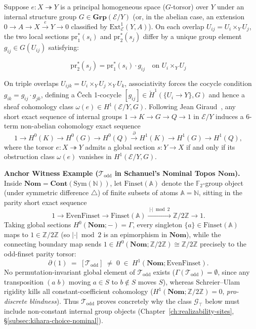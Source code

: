 \documentclass[10pt,twoside,openright]{book}
\theoremstyle{crmplain}
\theoremstyle{crmdef}
\theoremstyle{crmremark}
\begin{document}
Suppose $e: X \twoheadrightarrow Y$ is a principal homogeneous space ($G$-torsor) over $Y$ under an internal structure group $G \in \mathbf{Grp}(\mathcal{E}/Y)$ (or, in the abelian case, an extension $0 \to A \to X \xrightarrow{e} Y \to 0$ classified by $\mathrm{Ext}^1_{\mathcal{E}}(Y, A)$). On each overlap $U_{ij} = U_i \times_Y U_j$, the two local sections $\mathrm{pr}_1^*(s_i)$ and $\mathrm{pr}_2^*(s_j)$ differ by a unique group element $g_{ij} \in G(U_{ij})$ satisfying:

\[
  \mathrm{pr}_2^*(s_j) = \mathrm{pr}_1^*(s_i) \cdot g_{ij} \quad \text{on } U_i \times_Y U_j
\]

On triple overlaps $U_{ijk} = U_i \times_Y U_j \times_Y U_k$, associativity forces the cocycle condition $g_{ik} = g_{ij} \cdot g_{jk}$, defining a \v{C}ech 1-cocycle $[g_{ij}] \in \check{H}^1(\{U_i \to Y\}, G)$ and hence a sheaf cohomology class $\omega(e) \in H^1(\mathcal{E}/Y, G)$. Following Jean Giraud~\cite[Chs.~III--IV]{Giraud71}, any short exact sequence of internal groups $1 \to K \to G \to Q \to 1$ in $\mathcal{E}/Y$ induces a $6$-term non-abelian cohomology exact sequence
\[
  1 \longrightarrow H^0(K) \longrightarrow H^0(G) \longrightarrow H^0(Q) \xrightarrow{\;\partial\;} H^1(K) \longrightarrow H^1(G) \longrightarrow H^1(Q),
\]
where the torsor $e: X \twoheadrightarrow Y$ admits a global section $s: Y \to X$ if and only if its obstruction class $\omega(e)$ vanishes in $H^1(\mathcal{E}/Y, G)$.

\medskip
\noindent\textbf{Anchor Witness Example ($\mathcal{T}_{\mathrm{odd}}$ in Schanuel's Nominal Topos $\mathbf{Nom}$).} Inside $\mathbf{Nom} = \mathbf{Cont}(\mathrm{Sym}(\mathbb{N}))$, let $\mathrm{Finset}(\mathbb{A})$ denote the $\mathbb{F}_2$-group object (under symmetric difference $\triangle$) of finite subsets of atoms $\mathbb{A} = \mathbb{N}$, sitting in the parity short exact sequence
\[
  1 \longrightarrow \mathrm{EvenFinset} \longrightarrow \mathrm{Finset}(\mathbb{A}) \xrightarrow{\;|\cdot|\bmod 2\;} \mathbb{Z}/2\mathbb{Z} \longrightarrow 1.
\]
Taking global sections $H^0(\mathbf{Nom}; -) = \Gamma$, every singleton $\{a\} \in \mathrm{Finset}(\mathbb{A})$ maps to $1 \in \mathbb{Z}/2\mathbb{Z}$ (so $|\cdot|\bmod 2$ is an epimorphism in $\mathbf{Nom}$), while the connecting boundary map sends $1 \in H^0(\mathbf{Nom}; \mathbb{Z}/2\mathbb{Z}) \cong \mathbb{Z}/2\mathbb{Z}$ precisely to the odd-finset parity torsor:
\[
  \partial(1) \;=\; [\mathcal{T}_{\mathrm{odd}}] \;\neq\; 0 \;\in\; H^1(\mathbf{Nom}; \mathrm{EvenFinset}).
\]
No permutation-invariant global element of $\mathcal{T}_{\mathrm{odd}}$ exists ($\Gamma(\mathcal{T}_{\mathrm{odd}}) = \emptyset$, since any transposition $(a\; b)$ moving $a \in S$ to $b \notin S$ moves $S$), whereas Schreier--Ulam rigidity kills all constant-coefficient cohomology ($H^1(\mathbf{Nom}; \mathbb{Z}/2\mathbb{Z}) = 0$, \emph{pro-discrete blindness}). Thus $\mathcal{T}_{\mathrm{odd}}$ proves concretely why the class $\mathcal{G}_{\top}$ below must include non-constant internal group objects (Chapter~\ref{ch:realizability-sites}, \S\ref{subsec:kihara-choice-nominal}).
\end{document}
